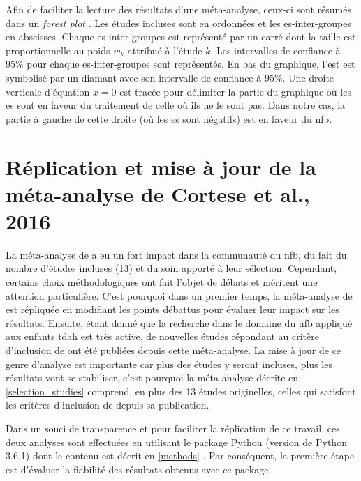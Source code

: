 Afin de faciliter la lecture des résultats d'une méta-analyse, ceux-ci sont résumés dans un \textit{forest plot} \citep[Chapitre~1]{Borenstein2009}. Les études incluses sont
en ordonnées et les \gls{es}-inter-groupes en abscisses. Chaque \gls{es}-inter-groupes est représenté par un carré dont la taille est proportionnelle
au poids $w_k$ attribué à l'étude $k$. Les intervalles de confiance à 95\% pour chaque \gls{es}-inter-groupes sont représentés. En bas du graphique, l'\gls{est}
est symbolisé par un diamant avec son intervalle de confiance à 95\%. Une droite verticale d'équation $x = 0$ est tracée pour délimiter la
partie du graphique où les \gls{es} sont en faveur du traitement de celle où ils ne le sont pas. Dans notre cas, la partie à gauche de cette droite (où les \gls{es}
sont négatifs) est en faveur du \gls{nfb}.

\section{Réplication et mise à jour de la méta-analyse de Cortese et al., 2016} 

La méta-analyse de \citet{Cortese2016} a eu un fort impact dans la communauté du \gls{nfb}, du fait du nombre d'études incluses (13) et 
du soin apporté à leur sélection. Cependant, certains choix méthodologiques ont fait l'objet de débats \citep{Micoulaud2016} et
méritent une attention particulière.
C'est pourquoi dans un premier temps, la méta-analyse de \citet{Cortese2016} est répliquée en modifiant les points débattus pour évaluer leur impact sur les
résultats. Ensuite, étant donné que la recherche dans le domaine du \gls{nfb} appliqué aux enfants \gls{tdah} est très active, de nouvelles études répondant au 
critère d'inclusion de \citet{Cortese2016} ont été publiées depuis cette méta-analyse. La mise à jour de ce genre d'analyse est importante
car plus des études y seront incluses, plus les résultats vont se stabiliser, c'est pourquoi la méta-analyse décrite en \ref{selection_studies}
comprend, en plus des 13 études originelles, celles qui
satisfont les critères d'inclusion de \citet{Cortese2016} depuis sa publication.

Dans un souci de transparence et pour faciliter la réplication de ce travail, ces deux analyses sont effectuées en utilisant le package Python 
(version de Python 3.6.1) dont le contenu est décrit en \ref{methods} \citep{Bussalb2019c}. Par conséquent, la première étape est d'évaluer la
fiabilité des résultats obtenus avec ce package.

